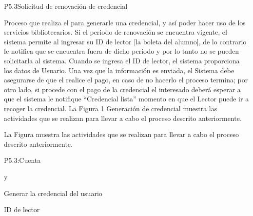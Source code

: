 
\begin{Proceso}{P5.3}{Solicitud de renovación de credencial} {
  

  Proceso que realiza el  para generarle una credencial, y así poder hacer uso de los servicios bibliotecarios.
  Si el periodo de renovación se encuentra vigente, el sistema permite al  ingresar su ID de lector [la boleta del alumno], de lo contrario le notifica que se encuentra fuera de dicho periodo y por lo tanto no se pueden solicitarla al sistema. Cuando se ingresa el ID de lector, el sistema proporciona los datos de Usuario.
  Una vez que la información es enviada, el Sistema debe asegurarse de que el  realice el pago, en caso de no hacerlo el proceso termina; por otro lado, si procede con el pago de la credencial el interesado deberá esperar a que el sistema le notifique “Credencial lista” momento en que el Lector puede ir a recoger la credencial.
  La Figura 1 Generación de credencial muestra las actividades que se realizan para llevar a cabo el proceso descrito anteriormente.


  \noindent La Figura  muestra las actividades que se realizan para llevar a cabo el proceso descrito anteriormente.


} {P5.3:Cuenta}


   { %
     y 
  }

   { %
    Generar la credencial del usuario
  }

   { %
    ID de lector
  }
  

\end{Proceso}
